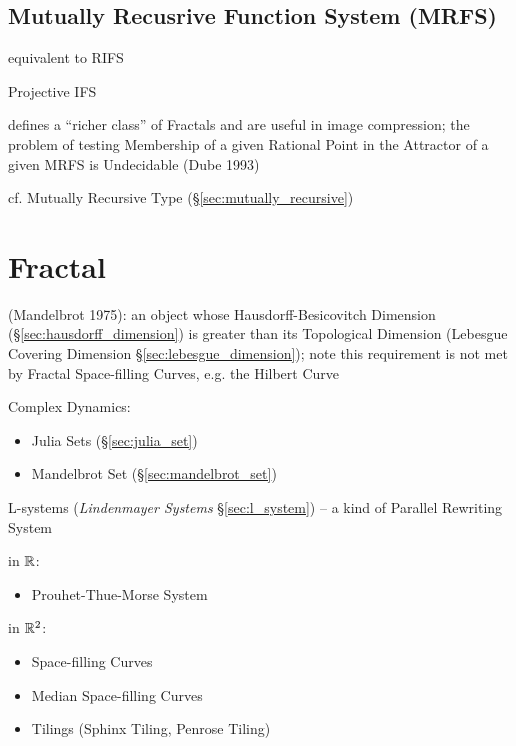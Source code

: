 \subsection{Mutually Recusrive Function System (MRFS)}\label{sec:mrfs}

equivalent to RIFS

Projective IFS

defines a ``richer class'' of Fractals and are useful in image compression; the
problem of testing Membership of a given Rational Point in the Attractor of a
given MRFS is Undecidable (Dube 1993)

cf. Mutually Recursive Type (\S\ref{sec:mutually_recursive})



\section{Fractal}\label{sec:fractal}

(Mandelbrot 1975): an object whose Hausdorff-Besicovitch Dimension
(\S\ref{sec:hausdorff_dimension}) is greater than its Topological Dimension
(Lebesgue Covering Dimension \S\ref{sec:lebesgue_dimension}); note this
requirement is not met by Fractal Space-filling Curves, e.g. the Hilbert Curve

Complex Dynamics:
\begin{itemize}
  \item Julia Sets (\S\ref{sec:julia_set})
  \item Mandelbrot Set (\S\ref{sec:mandelbrot_set})
\end{itemize}

\asterism

L-systems (\emph{Lindenmayer Systems} \S\ref{sec:l_system}) -- a kind of
Parallel Rewriting System


in $\mathbb{R}$:
\begin{itemize}
  \item Prouhet-Thue-Morse System
\end{itemize}

in $\mathbb{R}^2$:
\begin{itemize}
  \item Space-filling Curves
  \item Median Space-filling Curves
  \item Tilings (Sphinx Tiling, Penrose Tiling)
\end{itemize}

